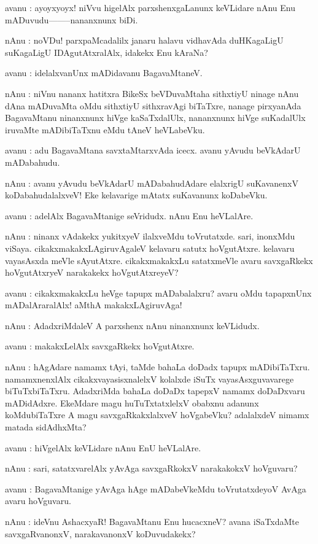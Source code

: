 avanu : ayoyxyoyx! niVvu higelAlx parxshenxgaLanunx keVLidare nAnu Enu mADuvudu--------nananxnunx biDi.

nAnu : noVDu! parxpaMcadalilx janaru halavu vidhavAda duHKagaLigU suKagaLigU IDAgutAtxralAlx, idakekx Enu kAraNa?

avanu : idelalxvanUnx mADidavanu BagavaMtaneV.

nAnu : niVnu nananx hatitxra BikeSx beVDuvaMtaha sithxtiyU ninage nAnu dAna mADuvaMta 
oMdu sithxtiyU sithxravAgi biTaTxre, nanage pirxyanAda BagavaMtanu ninanxnunx hiVge kaSaTxdalUlx, nananxnunx hiVge suKadalUlx iruvaMte mADibiTaTxnu eMdu tAneV heVLabeVku.

avanu : adu BagavaMtana savxtaMtarxvAda icecx. avanu yAvudu beVkAdarU mADabahudu.

nAnu : avanu yAvudu beVkAdarU mADabahudAdare elalxrigU suKavanenxV koDabahudalalxveV! Eke kelavarige mAtatx suKavanunx koDabeVku.

avanu : adelAlx BagavaMtanige seVridudx. nAnu Enu heVLalAre.

nAnu : ninanx vAdakekx yukitxyeV ilalxveMdu toVrutatxde. sari, inonxMdu viSaya. cikakxmakakxLAgiruvAgaleV kelavaru satutx hoVgutAtxre. kelavaru vayasAsxda meVle sAyutAtxre. cikakxmakakxLu satatxmeVle avaru savxgaRkekx hoVgutAtxryeV narakakekx hoVgutAtxreyeV?

avanu : cikakxmakakxLu heVge tapupx mADabalalxru? avaru oMdu tapapxnUnx mADalAraralAlx! aMthA makakxLAgiruvAga!

nAnu : AdadxriMdaleV A parxshenx nAnu ninanxnunx keVLidudx.

avanu : makakxLelAlx savxgaRkekx hoVgutAtxre.

nAnu : hAgAdare namamx tAyi, taMde bahaLa doDadx tapupx mADibiTaTxru. namamxnenxlAlx cikakxvayasisxnalelxV kolalxde iSuTx vayasAsxguvavarege biTuTxbiTaTxru. AdadxriMda bahaLa doDaDx tapepxV namamx doDaDxvaru mADidAdxre. EkeMdare magu huTuTxtatxlelxV obabxnu adanunx 
koMdubiTaTxre A magu savxgaRkakxlalxveV hoVgabeVku? adalalxdeV nimamx matada sidAdhxMta?

avanu : hiVgelAlx keVLidare nAnu EnU heVLalAre.

nAnu : sari, satatxvarelAlx yAvAga savxgaRkokxV narakakokxV hoVguvaru?

avanu : BagavaMtanige yAvAga hAge mADabeVkeMdu toVrutatxdeyoV AvAga avaru hoVguvaru.

nAnu : ideVnu AshacxyaR! BagavaMtanu Enu hucacxneV? avana iSaTxdaMte savxgaRvanonxV, narakavanonxV koDuvudakekx?

